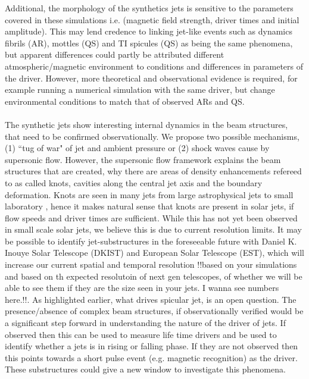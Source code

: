 \documentclass[12pt]{ociamthesis}
\newcommand{\np}{\\ \\}
\begin{document}
Additional, the morphology of the synthetics jets is sensitive to the parameters covered in these simulations i.e. (magnetic field strength, driver times and initial amplitude). This may lend credence to linking jet-like events such as dynamics fibrils (AR), mottles (QS) and TI spicules (QS) as being the same phenomena, but apparent differences could partly be attributed different atmospheric/magnetic environment to conditions and differences in parameters of the driver. However, more theoretical and observational evidence is required, for example running a numerical simulation with the same driver, but change environmental conditions to match that of observed ARs and QS. \np
%
The synthetic jets show interesting internal dynamics in the beam structures, that need to be confirmed observationally. We propose two possible mechanisms, (1) ``tug of war" of jet and ambient pressure or (2) shock waves cause by supersonic flow. However, the supersonic flow framework explains the beam structures that are created, why there are areas of density enhancements refereed to as called knots, cavities along the central jet axis and the boundary deformation. Knots are seen in many jets from large astrophysical jets \citep{van_Putten_1996ApJ467L57V, DeGouveiaDalPino2005, Hada2013ApJ77570H, Cohen2014ApJ787151C, Hervet2017AnA606A103H} to small laboratory \citep{Menon2010, Edgington-Mitchell2014, Ono2014}, hence it makes natural sense that knots are present in solar jets, if flow speeds and driver times are sufficient. While this has not yet been observed in small scale solar jets, we believe this is due to current resolution limits. It may be possible to identify jet-substructures in the foreseeable future with  Daniel K. Inouye Solar Telescope (DKIST) and European Solar Telescope (EST), which will increase our current spatial and temporal resolution {\color{green} !!based on your simulations and based on th expected resolutoin of next gen telescopes, of whether we will be able to see them if they are the size seen in your jets. I wanna see numbers here.!!}. As highlighted earlier, what drives spicular jet, is an open question. The presence/absence of complex beam structures, if observationally verified would be a significant step forward in understanding the nature of the driver of jets. If observed then this can be used to measure life time drivers and be used to identify whether a jets is in rising or falling phase. If they are not observed then this points towards a short pulse event (e.g. magnetic recognition) as the driver. These substructures could give a new window to investigate this phenomena.



\end{document}
